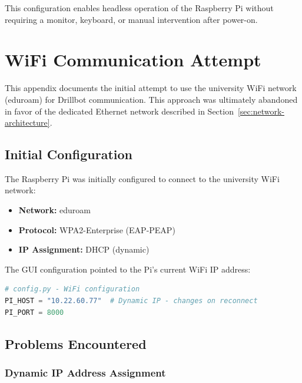 This configuration enables headless operation of the Raspberry Pi without requiring a monitor, keyboard, or manual intervention after power-on.




\section{WiFi Communication Attempt}
\label{appendix:wifi-communication}

This appendix documents the initial attempt to use the university WiFi network (eduroam) for Drillbot communication. This approach was ultimately abandoned in favor of the dedicated Ethernet network described in Section~\ref{sec:network-architecture}.

\subsection{Initial Configuration}

The Raspberry Pi was initially configured to connect to the university WiFi network:

\begin{itemize}
    \item \textbf{Network:} eduroam
    \item \textbf{Protocol:} WPA2-Enterprise (EAP-PEAP)
    \item \textbf{IP Assignment:} DHCP (dynamic)
\end{itemize}

The GUI configuration pointed to the Pi's current WiFi IP address:

\begin{lstlisting}[language=Python, basicstyle=\ttfamily\small, frame=single]
# config.py - WiFi configuration
PI_HOST = "10.22.60.77"  # Dynamic IP - changes on reconnect
PI_PORT = 8000
\end{lstlisting}

\subsection{Problems Encountered}

\subsubsection{Dynamic IP Address Assignment}

